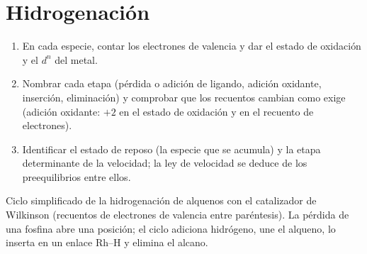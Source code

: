\section{Hidrogenación}

\begin{method}\label{met:b3:homogeneous-catalysis:read-cycle}
\begin{enumerate}
  \item En cada especie, contar los electrones de valencia y dar el estado de
        oxidación y el $d^n$ del metal.
  \item Nombrar cada etapa (pérdida o adición de ligando, adición oxidante,
        inserción, eliminación) y comprobar que los recuentos cambian como exige
        (adición oxidante: $+2$ en el estado de oxidación y en el recuento de electrones).
  \item Identificar el estado de reposo (la especie que se acumula) y la
        etapa determinante de la velocidad; la ley de velocidad se deduce de los preequilibrios
        entre ellos.
\end{enumerate}
\end{method}

\begin{omfigure}

{\small Ciclo simplificado de la hidrogenación de alquenos con el catalizador de Wilkinson
(recuentos de electrones de valencia entre paréntesis). La pérdida de una fosfina abre una posición; el
ciclo adiciona hidrógeno, une el alqueno, lo inserta en un enlace Rh--H y
elimina el alcano.}
\end{omfigure}


